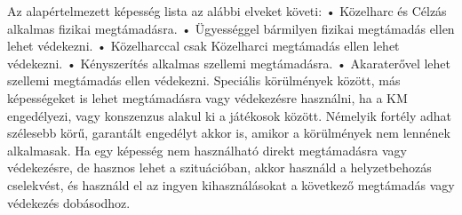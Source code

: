 \documentclass[oneside]{book}
\begin{document}
Az alapértelmezett képesség lista az alábbi elveket követi:
    • Közelharc és Célzás alkalmas fizikai megtámadásra.
    • Ügyességgel bármilyen fizikai megtámadás ellen lehet védekezni.
    • Közelharccal csak Közelharci megtámadás ellen lehet védekezni.
    • Kényszerítés alkalmas szellemi megtámadásra.
    • Akaraterővel lehet szellemi megtámadás ellen védekezni.
Speciális körülmények között, más képességeket is lehet megtámadásra vagy védekezésre használni, ha a KM engedélyezi, vagy konszenzus alakul ki a játékosok között. Némelyik fortély adhat szélesebb körű, garantált engedélyt akkor is, amikor a körülmények nem lennének alkalmasak. Ha egy képesség nem használható direkt megtámadásra vagy védekezésre, de hasznos lehet a szituációban, akkor használd a helyzetbehozás cselekvést, és használd el az ingyen kihasználásokat a következő megtámadás vagy védekezés dobásodhoz.
\end{document}
